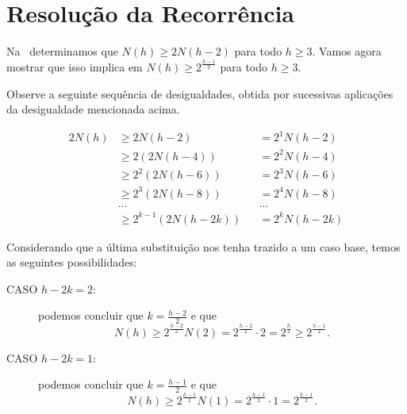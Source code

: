 \documentclass[11pt,twoside]{article}
\theoremstyle{definition}
\begin{document}
\section{Resolução da Recorrência}

Na~ determinamos que \( N(h) \geq 2N(h-2) \) para todo \( h \geq 3 \). Vamos agora mostrar que isso implica em \( N(h) \geq 2^{\frac{h-1}{2}} \) para todo \( h \geq 3 \).

Observe a seguinte sequência de desigualdades, obtida por sucessivas aplicações da desigualdade mencionada acima.

\begin{alignat*}{2}
	N(h) & \geq 2N(h-2)           &  & = 2^1 N(h-2)  \\
	     & \geq 2(2N(h-4))        &  & = 2^2 N(h-4)  \\
	     & \geq 2^2(2N(h-6))      &  & = 2^3 N(h-6)  \\
	     & \geq 2^3(2N(h-8))      &  & = 2^4 N(h-8)  \\
	     & \dots                  &  & \dots         \\
	     & \geq 2^{k-1}(2N(h-2k)) &  & = 2^k N(h-2k)
\end{alignat*}

Considerando que a última substituição nos tenha trazido a um caso base, temos as seguintes possibilidades:

\begin{description}
	\item[CASO \( h-2k = 2 \):] podemos concluir que \( k = \frac{h-2}{2} \) e que \[ N(h) \geq 2^{\frac{h-2}{2}} N(2) = 2^{\frac{h-2}{2}} \cdot 2 = 2^{\frac{h}{2}} \geq 2^{\frac{h-1}{2}}. \]
	\item[CASO \( h-2k = 1 \):] podemos concluir que \( k = \frac{h-1}{2} \) e que \[ N(h) \geq 2^{\frac{h-1}{2}} N(1) = 2^{\frac{h-1}{2}} \cdot 1 = 2^{\frac{h-1}{2}}. \]
\end{description}

\printbibliography
\end{document}
